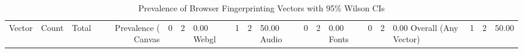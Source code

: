 \begin{table}[htbp]
\centering
\caption{Prevalence of Browser Fingerprinting Vectors with 95\% Wilson CIs}
\label{tab:prevalence_summary}
\begin{tabular}{lrrrrr}
\hline
Vector & Count & Total & Prevalence (%
\hline
Canvas & 0 & 2 & 0.00%
Webgl & 1 & 2 & 50.00%
Audio & 0 & 2 & 0.00%
Fonts & 0 & 2 & 0.00%
Overall (Any Vector) & 1 & 2 & 50.00%
\hline
\end{tabular}
\end{table}
